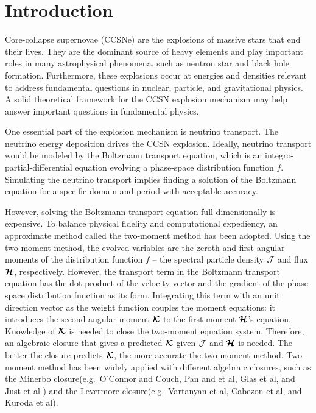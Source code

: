 \section{Introduction}

Core-collapse supernovae (CCSNe) are the explosions of massive stars that end their lives.
They are the dominant source of heavy elements and play important roles in many astrophysical phenomena, such as neutron star and black hole formation.  
Furthermore, these explosions occur at energies and densities relevant to address fundamental questions in nuclear, particle, and gravitational physics. 
A solid theoretical framework for the CCSN explosion mechanism may help answer important questions in fundamental physics.\cite{janka_etal_2007}

One essential part of the explosion mechanism is neutrino transport.
The neutrino energy deposition drives the CCSN explosion.\cite{mezzacappaMesser_1999}
Ideally, neutrino transport would be modeled by the Boltzmann transport equation, which is an integro-partial-differential equation evolving a phase-space distribution function $f$.\cite{Bruenn_1985}
Simulating the neutrino transport implies finding a solution of the Boltzmann equation for a specific domain and period with acceptable accuracy.

However, solving the Boltzmann transport equation full-dimensionally is expensive.
To balance physical fidelity and computational expediency, an approximate method called the two-moment method has been adopted.\cite{mezzacappaMesser_1999}
Using the two-moment method, the evolved variables are the zeroth and first angular moments of the distribution function $f$ -- the spectral particle density $\mathcal{J}$ and flux $\boldsymbol{\mathcal{H}}$, respectively.
However, the transport term in the Boltzmann transport equation has the dot product of the velocity vector and the gradient of the phase-space distribution function as its form.
Integrating this term with an unit direction vector as the weight function couples the moment equations: it introduces the second angular moment $\boldsymbol{\mathcal{K}}$ to the first moment $\boldsymbol{\mathcal{H}}$'s equation.
Knowledge of $\boldsymbol{\mathcal{K}}$ is needed to close the two-moment equation system.
Therefore, an algebraic closure that gives a predicted $\boldsymbol{\mathcal{K}}$ given $\mathcal{J}$ and $\boldsymbol{\mathcal{H}}$ is needed.
The better the closure predicts $\boldsymbol{\mathcal{K}}$, the more accurate the two-moment method. 
Two-moment method has been widely applied with different algebraic closures, such as the Minerbo\cite{minerbo_1978} closure(e.g.~{O'Connor} and {Couch}\cite{oConnorCouch_2018}, Pan and et al\cite{pan_etal_2018}, Glas et al\cite{glas_etal_2018}, and Just et al\cite{just_etal_2018} ) and the Levermore\cite{levermore_1984} closure(e.g.~Vartanyan et al\cite{vartanyan_etal_2018}, Cabezon et al\cite{cabezon_etal_2018}, and Kuroda et al\cite{kuroda_etal_2016}). 

